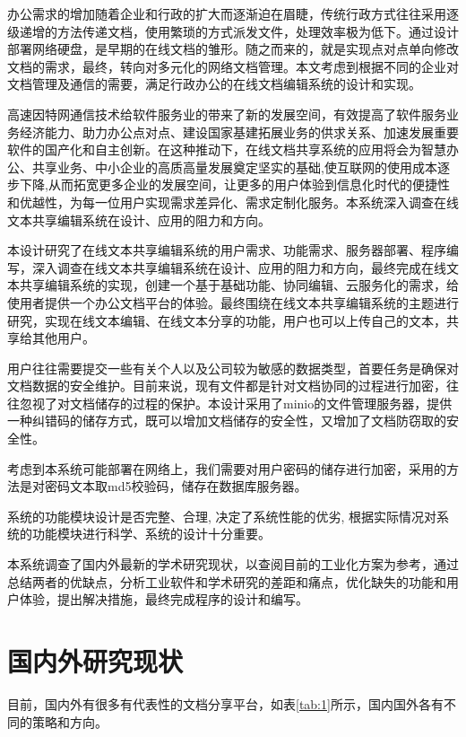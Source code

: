 \documentclass[forprint]{software}
\begin{document}
办公需求的增加随着企业和行政的扩大而逐渐迫在眉睫，传统行政方式往往采用逐级递增的方法传递文档，使用繁琐的方式派发文件，处理效率极为低下。通过设计部署网络硬盘，是早期的在线文档的雏形。随之而来的，就是实现点对点单向修改文档的需求，最终，转向对多元化的网络文档管理。本文考虑到根据不同的企业对文档管理及通信的需要，满足行政办公的在线文档编辑系统的设计和实现。

高速因特网通信技术给软件服务业的带来了新的发展空间，有效提高了软件服务业务经济能力、助力办公点对点、建设国家基建拓展业务的供求关系、加速发展重要软件的国产化和自主创新。在这种推动下，在线文档共享系统的应用将会为智慧办公、共享业务、中小企业的高质高量发展奠定坚实的基础,使互联网的使用成本逐步下降,从而拓宽更多企业的发展空间，让更多的用户体验到信息化时代的便捷性和优越性，为每一位用户实现需求差异化、需求定制化服务。本系统深入调查在线文本共享编辑系统在设计、应用的阻力和方向。

本设计研究了在线文本共享编辑系统的用户需求、功能需求、服务器部署、程序编写，深入调查在线文本共享编辑系统在设计、应用的阻力和方向，最终完成在线文本共享编辑系统的实现，创建一个基于基础功能、协同编辑、云服务化的需求，给使用者提供一个办公文档平台的体验。最终围绕在线文本共享编辑系统的主题进行研究，实现在线文本编辑、在线文本分享的功能，用户也可以上传自己的文本，共享给其他用户。

用户往往需要提交一些有关个人以及公司较为敏感的数据类型，首要任务是确保对文档数据的安全维护。目前来说，现有文件都是针对文档协同的过程进行加密，往往忽视了对文档储存的过程的保护。本设计采用了minio的文件管理服务器，提供一种纠错码的储存方式，既可以增加文档储存的安全性，又增加了文档防窃取的安全性。

考虑到本系统可能部署在网络上，我们需要对用户密码的储存进行加密，采用的方法是对密码文本取md5校验码，储存在数据库服务器。

系统的功能模块设计是否完整、合理, 决定了系统性能的优劣, 根据实际情况对系统的功能模块进行科学、系统的设计十分重要。

本系统调查了国内外最新的学术研究现状，以查阅目前的工业化方案为参考，通过总结两者的优缺点，分析工业软件和学术研究的差距和痛点，优化缺失的功能和用户体验，提出解决措施，最终完成程序的设计和编写。

\section{国内外研究现状}

目前，国内外有很多有代表性的文档分享平台，如表\ref{tab:1}所示，国内国外各有不同的策略和方向。
\end{document}
